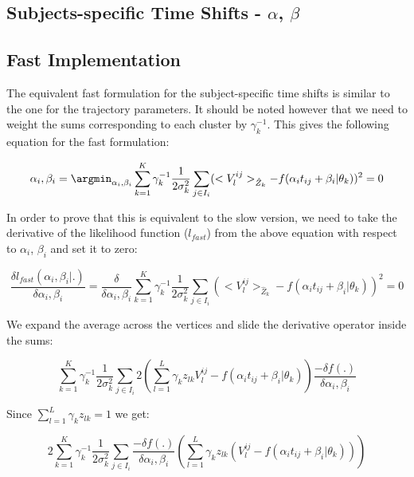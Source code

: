 \subsection{Subjects-specific Time Shifts - $\alpha$, $\beta$}

\subsection{Fast Implementation}

The equivalent fast formulation for the subject-specific time shifts is similar to the one for the trajectory parameters. It should be noted however that we need to weight the sums corresponding to each cluster by $\gamma_{k}^{-1}$. This gives the following equation for the fast formulation:

\begin{equation}
 \alpha_i, \beta_i = \argmin_{\alpha_i, \beta_i}  \sum_{k=1}^K \gamma_k^{-1} \frac{1}{2\sigma_k^2} \sum_{j \in I_i} (<V_l^{ij}>_{\hat{Z}_k} - f(\alpha_i t_{ij} + \beta_i | \theta_k))^2 = 0
\end{equation}

In order to prove that this is equivalent to the slow version, we need to take the derivative of the likelihood function ($l_{fast}$) from the above equation with respect to $\alpha_i$, $\beta_i$ and set it to zero:

\begin{equation}
 \frac{\delta l_{fast}(\alpha_i, \beta_i|.)}{\delta \alpha_i, \beta_i} =  \frac{\delta}{\delta \alpha_i, \beta_i} \sum_{k=1}^K \gamma_k^{-1} \frac{1}{2\sigma_k^2} \sum_{j \in I_i} (<V_l^{ij}>_{\hat{Z}_k} - f(\alpha_i t_{ij} + \beta_i | \theta_k))^2 = 0
\end{equation}

We expand the average across the vertices and slide the derivative operator inside the sums:

\begin{equation}
 \sum_{k=1}^K \gamma_k^{-1} \frac{1}{2\sigma_k^2} \sum_{j \in I_i} 2 \left( \sum_{l=1}^L \gamma_k z_{lk} V_l^{ij} - f(\alpha_i t_{ij} + \beta_i | \theta_k) \right) \frac{-\delta f(.)}{\delta \alpha_i, \beta_i}
\end{equation}

Since $ \sum_{l=1}^L \gamma_k z_{lk} = 1$ we get:

\begin{equation}
 2 \sum_{k=1}^K \gamma_k^{-1} \frac{1}{2\sigma_k^2} \sum_{j \in I_i} \frac{-\delta f(.)}{\delta \alpha_i, \beta_i}  \left( \sum_{l=1}^L \gamma_k z_{lk} (V_l^{ij} - f(\alpha_i t_{ij} + \beta_i | \theta_k)) \right) 
\end{equation}

